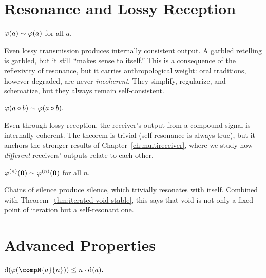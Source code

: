 \section{Resonance and Lossy Reception}
\label{sec:lossy-resonance}

\begin{theorem}
\label{thm:receiver-self-resonance}
$\varphi(a) \sim \varphi(a)$ for all $a$.
\end{theorem}

Even lossy transmission produces internally consistent output.  A garbled
retelling is garbled, but it still ``makes sense to itself.''  This is
a consequence of the reflexivity of resonance, but it carries anthropological
weight: oral traditions, however degraded, are never \emph{incoherent}.
They simplify, regularize, and schematize, but they always remain
self-consistent.

\begin{theorem}
\label{thm:lossy-compound-resonance}
$\varphi(a\circ b) \sim \varphi(a\circ b).$
\end{theorem}

Even through lossy reception, the receiver's output from a compound signal
is internally coherent.  The theorem is trivial (self-resonance is always
true), but it anchors the stronger results of Chapter~\ref{ch:multireceiver},
where we study how \emph{different} receivers' outputs relate to each other.

\begin{theorem}
\label{thm:void-iterate-resonates}
$\varphi^{(n)}(\mathbf{0}) \sim \varphi^{(n)}(\mathbf{0})$ for all $n$.
\end{theorem}

Chains of silence produce silence, which trivially resonates with itself.
Combined with Theorem~\ref{thm:iterated-void-stable}, this says that
void is not only a fixed point of iteration but a self-resonant one.


\section{Advanced Properties}
\label{sec:lossy-advanced}

\begin{theorem}
\label{thm:lossy-composeN}
$\depth(\varphi(\compN{a}{n})) \le n\cdot\depth(a).$
\end{theorem}

